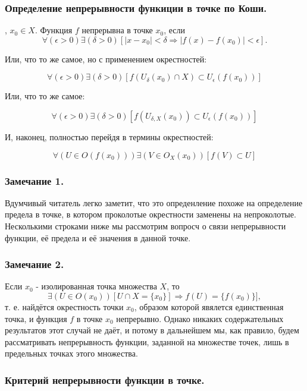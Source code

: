 \subsubsection{Определение непрерывности функиции в точке по Коши.}

\opred

\fXR, $x_0 \in X$.
Функция $f$ непрерывна в точке $x_0$, если
$$
\forall(\epsilon>0)\exists(\delta>0)[|x-x_0|<\delta \Rightarrow |f(x)-f(x_0)|<\epsilon].
$$

Или, что то же самое, но с применением окрестностей:

$$
\forall(\epsilon>0)\exists(\delta>0) [f(U_{\delta}(x_0) \cap X) \subset U_{\epsilon}(f(x_0))]
$$

Или, что то же самое:

$$
\forall(\epsilon>0)\exists(\delta>0) [f(U_{\delta,X}(x_0)) \subset U_{\epsilon}(f(x_0))]
$$

И, наконец, полностью перейдя в термины окрестностей:

$$
\forall(U \in O(f(x_0)))\exists(V \in O_X(x_0)) [f(V) \subset U]
$$

\subsubsection{Замечание 1.}

Вдумчивый читатель легко заметит, что это опреденление похоже на определение предела в точке, в котором проколотые окрестности заменены на непроколотые. Несколькими строками ниже мы рассмотрим вопросч о связи непрерывности функции, её предела и её значения в данной точке.

\subsubsection{Замечание 2.}

Если $x_0$ - изолированная точка множества $X$, то
$$
 \exists(U \in O(x_0))[U \cap X = \{x_0\}] \Rightarrow f(U)=\{f(x_0)\}],
$$
т. е. найдётся окрестность точки $x_0$, образом которой явялется единственная точка, и функция $f$ в точке $x_0$ непрерывно. Однако никаких содержательных результатов этот случай не даёт, и потому в дальнейшем мы, как правило, будем рассматривать непрерывность функции, заданной на множестве точек, лишь в предельных точках этого множества.

\subsubsection{Критерий непрерывности функции в точке.}

